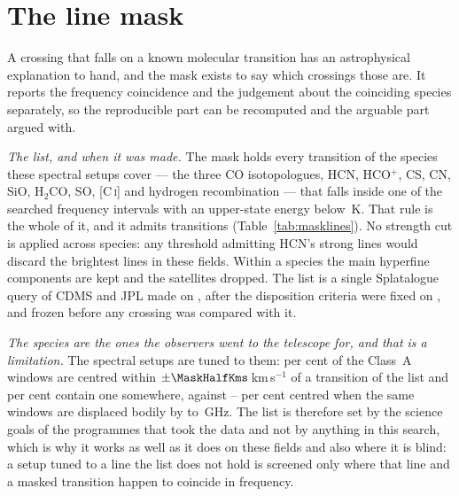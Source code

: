 \section{The line mask}
\label{app:linemask}

A crossing that falls on a known molecular transition has an astrophysical
explanation to hand, and the mask exists to say which crossings those are. It
reports the frequency coincidence and the judgement about the coinciding
species separately, so the reproducible part can be recomputed and the
arguable part argued with.

\emph{The list, and when it was made.} The mask holds every transition of the
\FrNSpec{} species these spectral setups cover --- the three CO isotopologues,
HCN, HCO$^{+}$, CS, CN, SiO, H$_2$CO, SO, [C\,\textsc{i}] and hydrogen
recombination --- that falls inside one of the \McNIsland{} searched frequency
intervals with an upper-state energy below \McEuMax\,K. That rule is the whole
of it, and it admits \FrNTrans{} transitions (Table~\ref{tab:masklines}).
No strength cut is applied across species: any threshold admitting HCN's
strong lines would discard the brightest lines in these fields. Within a
species the main hyperfine components are kept and the satellites
dropped. The list is a single Splatalogue query of CDMS and
JPL \citep{Pickett1998,CDMS2005} made on \MkListDate{}, after the disposition
criteria were fixed on \MkCritDate, and frozen before any crossing was
compared with it.

\emph{The species are the ones the observers went to the telescope for, and
that is a limitation.} The spectral setups are tuned to them: \TnCenPct{} per
cent of the \NWinA{} Class~A windows are centred within
$\pm\MaskHalfKms$\,km\,s$^{-1}$ of a transition of the list and \TnWinPct{}
per cent contain one somewhere, against \TnCtrlCenLo--\TnCtrlCenHi{} per cent
centred when the same windows are displaced bodily by \TnShiftLoGHz{} to
\TnShiftHiGHz\,GHz. The list is therefore set by the science goals of the
programmes that took the data and not by anything in this search, which is
why it works as well as it does on these fields and also where it is blind: a
setup tuned to a line the list does not hold is screened only where that line
and a masked transition happen to coincide in frequency.

